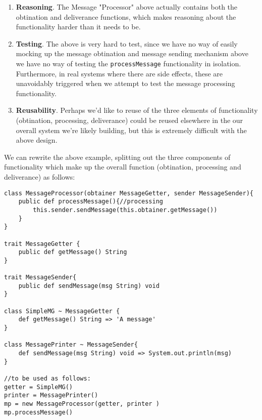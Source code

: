 \documentclass[conc-doc]{subfiles}
\begin{document}
\begin{enumerate}
	\item \textbf{Reasoning}. The Message "Processor" above actually contains both the obtination and deliverance functions, which makes reasoning about the functionality harder than it needs to be. 
	\item \textbf{Testing}. The above is very hard to test, since we have no way of easily mocking up the message obtination and message sending mechanism above we have no way of testing the \lstinline{processMessage} functionality in isolation. Furthermore, in real systems where there are side effects, these are unavoidably triggered when we attempt to test the message processing functionality.
	\item \textbf{Reusability}. Perhaps we'd like to reuse of the three elements of functionality (obtination, processing, deliverance) could be reused elsewhere in the our overall system we're likely building, but this is extremely difficult with the above design.	
\end{enumerate}

We can rewrite the above example, splitting out the three components of functionality which make up the overall function (obtination, processing and deliverance) as follows:

\begin{lstlisting}
class MessageProcessor(obtainer MessageGetter, sender MessageSender){
	public def processMessage(){//processing
		this.sender.sendMessage(this.obtainer.getMessage())
	}
}

trait MessageGetter {
	public def getMessage() String
}

trait MessageSender{
	public def sendMessage(msg String) void
}

class SimpleMG ~ MessageGetter {
	def getMessage() String => 'A message'
}

class MessagePrinter ~ MessageSender{
	def sendMessage(msg String) void => System.out.println(msg)
}

//to be used as follows:
getter = SimpleMG()
printer = MessagePrinter()
mp = new MessageProcessor(getter, printer )
mp.processMessage()
\end{lstlisting}
\end{document}
